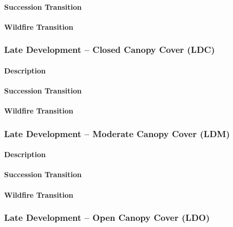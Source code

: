 \paragraph{Succession Transition}

\paragraph{Wildfire Transition}

\hrulefill


\subsubsection{Late Development – Closed Canopy Cover (LDC)}

\paragraph{Description}

\paragraph{Succession Transition}

\paragraph{Wildfire Transition}

\hrulefill

\subsubsection{Late Development – Moderate Canopy Cover (LDM)}

\paragraph{Description}

\paragraph{Succession Transition}

\paragraph{Wildfire Transition}

\hrulefill

\subsubsection{Late Development – Open Canopy Cover (LDO)}

